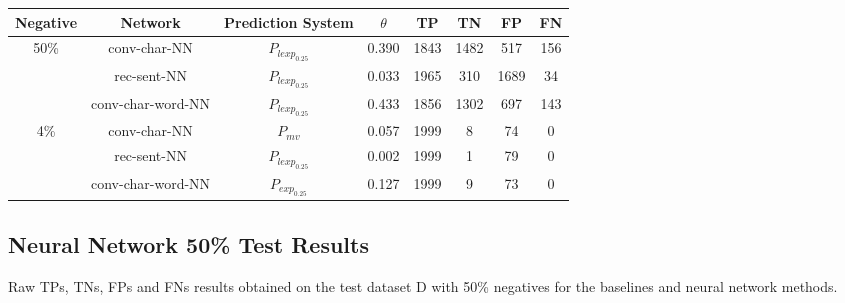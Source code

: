 \begin{adjustbox}{center}
    \begin{tabular}{|c|c|c|c|c|c|c|c|}
        \hline
        Negative               & Network                 & Prediction System &
        $\theta$               & TP                      & TN                &
        FP                     & FN
        \\ \hline
        \multirow{3}{*}{50\%}  & \gls{conv-char-NN}      & $P_{lexp_{0.25}}$ &
        0.390                  & 1843                    & 1482              &
        517                    & 156
        \\
        \cline{2-8}            & \gls{rec-sent-NN}       & $P_{lexp_{0.25}}$ &
        0.033                  & 1965                    & 310               &
        1689                   & 34
        \\
        \cline{2-8}            & \gls{conv-char-word-NN} & $P_{lexp_{0.25}}$ &
        0.433                  & 1856                    & 1302              &
        697                    & 143
        \\ \hline
        \multirow{3}{*}{4\%}   & \gls{conv-char-NN}      & $P_{mv}$          &
        0.057                  & 1999                    & 8                 &
        74                     & 0
        \\
        \cline{2-8}            & \gls{rec-sent-NN}       & $P_{lexp_{0.25}}$ &
        0.002                  & 1999                    & 1                 &
        79                     & 0
        \\
        \cline{2-8}            & \gls{conv-char-word-NN} & $P_{exp_{0.25}}$  &
        0.127                  & 1999                    & 9                 &
        73                     & 0
        \\ \hline
    \end{tabular}
\end{adjustbox}

\subsection{Neural Network 50\% Test Results}
\label{subsec:neural-network-50-test-results}

Raw \glspl{TP}, \glspl{TN}, \glspl{FP} and \glspl{FN} results obtained on the
test dataset \gls{D} with 50\% negatives for the baselines and neural network
methods.

